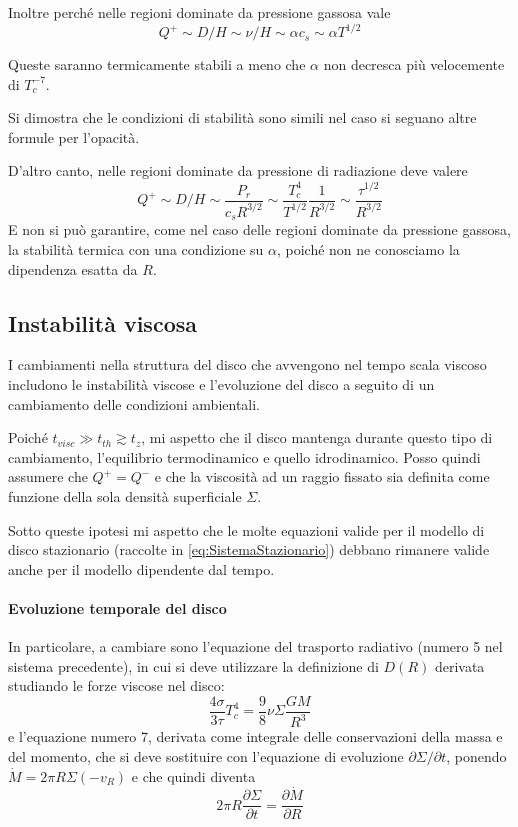 \documentclass[a4paperbi]{article}
\begin{document}
	Inoltre perché nelle regioni dominate da pressione gassosa vale
	\begin{equation}
		Q^+\sim D/H\sim \nu/H\sim\alpha c_s\sim\alpha T^{1/2}
	\end{equation}		
	
	Queste saranno termicamente stabili a meno che $\alpha$ non decresca più velocemente di $T_c^{-7}$.
	
	Si dimostra che le condizioni di stabilità sono simili nel caso si seguano altre formule per l'opacità.
	
	D'altro canto, nelle regioni dominate da pressione di radiazione deve valere 
	\begin{equation}
		Q^+\sim D/H\sim \frac{P_r}{c_sR^{3/2}}\sim\frac{T_c^4}{T^{1/2}}\frac{1}{R^{3/2}}\sim\frac{\tau^{1/2}}{R^{3/2}}
	\end{equation}
	E non si può garantire, come nel caso delle regioni dominate da pressione gassosa, la stabilità termica con una condizione su $\alpha$, poiché non ne conosciamo la dipendenza esatta da $R$.

\subsection{Instabilità viscosa}
	I cambiamenti nella struttura del disco che avvengono nel tempo scala viscoso includono le instabilità viscose e l'evoluzione del disco a seguito di un cambiamento delle condizioni ambientali.
	
	Poiché $t_{visc}\gg t_{th}\gtrsim t_z$, mi aspetto che il disco mantenga durante questo tipo di cambiamento, l'equilibrio termodinamico e quello idrodinamico. Posso quindi assumere che $Q^+=Q^-$ e che la viscosità ad un raggio fissato sia definita come funzione della sola densità superficiale $\Sigma$. 
	
	Sotto queste ipotesi mi aspetto che le molte equazioni valide per il modello di disco stazionario (raccolte in \eqref{eq:SistemaStazionario})  debbano rimanere valide anche per il modello dipendente dal tempo. 
	
	\paragraph{Evoluzione temporale del disco}
	In particolare, a cambiare sono l'equazione del trasporto radiativo (numero 5 nel sistema precedente), in cui si deve utilizzare la definizione di $D(R)$ derivata studiando le forze viscose nel disco:
	\begin{equation}
		\frac{4\sigma}{3\tau}T_c^4=\frac{9}{8}\nu\Sigma\frac{GM}{R^3}
	\end{equation}
	e l'equazione numero 7, derivata come integrale delle conservazioni della massa e del momento, che si deve sostituire con l'equazione di evoluzione $\partial \Sigma/\partial t$, ponendo $\dot{M}=2\pi R\Sigma(-v_R)$ e che quindi diventa
	\begin{equation}
		2\pi R\frac{\partial \Sigma}{\partial t}=\frac{\partial\dot{M}}{\partial R}
	\end{equation}
	
\end{document}
